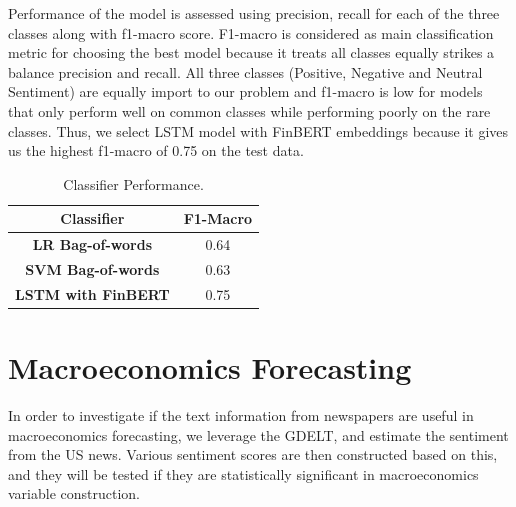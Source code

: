 \documentclass[11pt,a4paper]{article}
\begin{document}
Performance of the model is assessed using precision, recall for each of the three classes along with f1-macro score. F1-macro is considered as main classification metric for choosing the best model because it treats all classes equally strikes a balance precision and recall. All three classes (Positive, Negative and Neutral Sentiment) are equally import to our problem and f1-macro is low for models that only perform well on common classes while performing poorly on the rare classes. Thus, we select LSTM model with FinBERT embeddings because it gives us the highest f1-macro of 0.75 on the test data. 
\begin{center}
\begin{table}
\begin{center}
\begin{tabular}{| c | c |} 
 \hline
 \textbf{Classifier} & \textbf{F1-Macro} \\[0.5ex] 
 \hline\hline
 \textbf{LR Bag-of-words} & 0.64\\ 
 \hline
 \textbf{SVM Bag-of-words} & 0.63\\
 \hline
 \textbf{LSTM with FinBERT} & 0.75\\
 \hline
\end{tabular}
\caption{Classifier Performance.}
\label{tab:2}
\end{center}
\end{table}
\end{center}


\section{Macroeconomics Forecasting}

In order to investigate if the text information from newspapers are useful in macroeconomics forecasting, we leverage the GDELT, and estimate the sentiment from the US news. Various sentiment scores are then constructed based on this, and they will be tested if they are statistically significant in macroeconomics variable construction.
\end{document}
